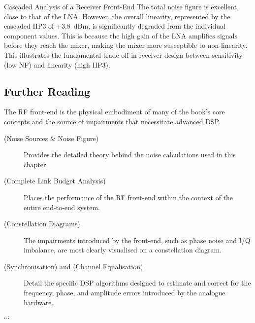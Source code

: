 \begin{workedexample}{Cascaded Analysis of a Receiver Front-End}
    The total noise figure is excellent, close to that of the LNA. However, the overall linearity, represented by the cascaded IIP3 of +3.8~dBm, is significantly degraded from the individual component values. This is because the high gain of the LNA amplifies signals before they reach the mixer, making the mixer more susceptible to non-linearity. This illustrates the fundamental trade-off in receiver design between sensitivity (low NF) and linearity (high IIP3).
\end{workedexample}

\begin{importantbox}
\section*{Further Reading}
The RF front-end is the physical embodiment of many of the book's core concepts and the source of impairments that necessitate advanced DSP.
\begin{description}
    \item[ (Noise Sources \& Noise Figure)] Provides the detailed theory behind the noise calculations used in this chapter.
    \item[ (Complete Link Budget Analysis)] Places the performance of the RF front-end within the context of the entire end-to-end system.
    \item[ (Constellation Diagrams)] The impairments introduced by the front-end, such as phase noise and I/Q imbalance, are most clearly visualised on a constellation diagram.
    \item[ (Synchronisation) and  (Channel Equalisation)] Detail the specific DSP algorithms designed to estimate and correct for the frequency, phase, and amplitude errors introduced by the analogue hardware.
\end{description}
\end{importantbox}
```